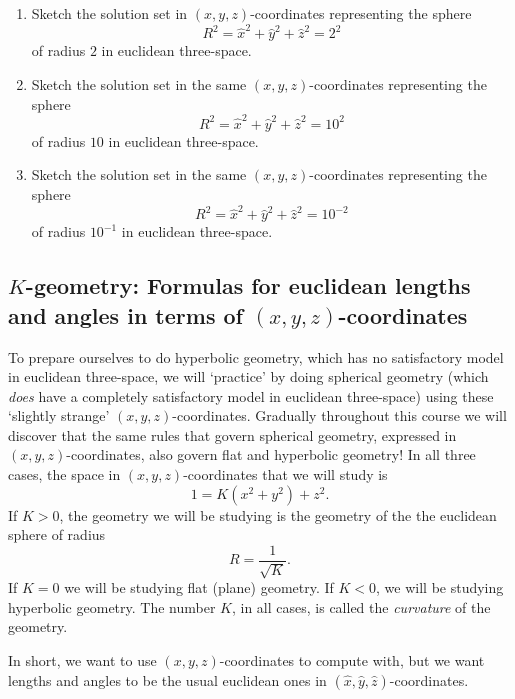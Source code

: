 \begin{exercise}\hfil
\begin{enumerate}
\item Sketch the solution set in $\left(  x,y,z\right)  $-coordinates
representing the sphere%
\[
R^{2}=\hat{x}^{2}+\hat{y}^{2}+\hat{z}^{2}=2^{2}%
\]
of radius $2$ in euclidean three-space.

\item Sketch the solution set in the same $\left(  x,y,z\right)  $-coordinates
representing the sphere%
\[
R^{2}=\hat{x}^{2}+\hat{y}^{2}+\hat{z}^{2}=10^{2}%
\]
of radius $10$ in euclidean three-space.

\item Sketch the solution set in the same $\left(  x,y,z\right)  $-coordinates
representing the sphere%
\[
R^{2}=\hat{x}^{2}+\hat{y}^{2}+\hat{z}^{2}=10^{-2}%
\]
of radius $10^{-1}$ in euclidean three-space.
\end{enumerate}
\end{exercise}

\subsection*{$K$-geometry: Formulas for euclidean lengths and angles in terms
of $\left(  x,y,z\right)  $-coordinates}

To prepare ourselves to do hyperbolic geometry, which has no satisfactory
model in euclidean three-space, we will `practice' by doing spherical geometry
(which \textit{does} have a completely satisfactory model in euclidean
three-space) using these `slightly strange' $\left(  x,y,z\right)
$-coordinates. Gradually throughout this course we will discover that the same
rules that govern spherical geometry, expressed in $\left(  x,y,z\right)
$-coordinates, also govern flat and hyperbolic geometry! In all three cases,
the space in $\left(  x,y,z\right)  $-coordinates that we will study is%
\begin{equation}
1=K\left(  x^{2}+y^{2}\right)  +z^{2}. \label{11}%
\end{equation}
If $K>0$, the geometry we will be studying is the geometry of the the
euclidean sphere of radius%
\[
R=\frac{1}{\sqrt{K}}.
\]
If $K=0$ we will be studying flat (plane) geometry. If $K<0$, we will be
studying hyperbolic geometry. The number $K$, in all cases, is called the
\textit{curvature} of the geometry.

In short, we want to use $\left(  x,y,z\right)  $-coordinates to compute with,
but we want lengths and angles to be the usual euclidean ones in $\left(
\hat{x},\hat{y},\hat{z}\right)  $-coordinates.

